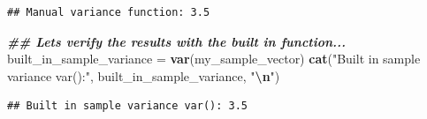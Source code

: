 \documentclass[
]{article}
\newenvironment{Shaded}{\begin{snugshade}}{\end{snugshade}}
\newcommand{\DocumentationTok}[1]{\textcolor[rgb]{0.56,0.35,0.01}{\textbf{\textit{#1}}}}
\newcommand{\FunctionTok}[1]{\textcolor[rgb]{0.13,0.29,0.53}{\textbf{#1}}}
\newcommand{\NormalTok}[1]{#1}
\newcommand{\OtherTok}[1]{\textcolor[rgb]{0.56,0.35,0.01}{#1}}
\newcommand{\SpecialCharTok}[1]{\textcolor[rgb]{0.81,0.36,0.00}{\textbf{#1}}}
\newcommand{\StringTok}[1]{\textcolor[rgb]{0.31,0.60,0.02}{#1}}
\begin{document}
\begin{verbatim}
## Manual variance function: 3.5
\end{verbatim}

\begin{Shaded}
\begin{Highlighting}[]
\DocumentationTok{\#\# Lets verify the results with the built in function...}
\NormalTok{built\_in\_sample\_variance }\OtherTok{=} \FunctionTok{var}\NormalTok{(my\_sample\_vector)}
\FunctionTok{cat}\NormalTok{(}\StringTok{"Built in sample variance var():"}\NormalTok{, built\_in\_sample\_variance, }\StringTok{"}\SpecialCharTok{\textbackslash{}n}\StringTok{"}\NormalTok{)}
\end{Highlighting}
\end{Shaded}

\begin{verbatim}
## Built in sample variance var(): 3.5
\end{verbatim}
\end{document}
